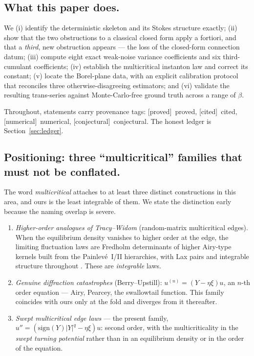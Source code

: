 \documentclass[11pt,reqno]{amsart}
\theoremstyle{plain}
\theoremstyle{definition}
\theoremstyle{remark}
\newcommand{\tagP}{{\footnotesize\textsf{[proved]}}}
\newcommand{\tagC}{{\footnotesize\textsf{[cited]}}}
\newcommand{\tagN}{{\footnotesize\textsf{[numerical]}}}
\newcommand{\tagX}{{\footnotesize\textsf{[conjectural]}}}
\begin{document}
\subsection{What this paper does.}
We (i) identify the deterministic skeleton and its Stokes structure exactly; (ii) show that the two
obstructions to a classical closed form apply a fortiori, and that a \emph{third}, new obstruction
appears --- the loss of the closed-form connection datum; (iii) compute eight exact weak-noise
variance coefficients and six third-cumulant coefficients; (iv) establish the multicritical
instanton law and correct its constant; (v) locate the Borel-plane data, with an explicit
calibration protocol that reconciles three otherwise-disagreeing estimators; and (vi) validate the
resulting trans-series against Monte-Carlo-free ground truth across a range of $\beta$.

Throughout, statements carry provenance tags: \tagP\ proved, \tagC\ cited, \tagN\ numerical,
\tagX\ conjectural. The honest ledger is Section~\ref{sec:ledger}.

\subsection{Positioning: three ``multicritical'' families that must not be conflated.}
The word \emph{multicritical} attaches to at least three distinct constructions in this area, and
ours is the least integrable of them. We state the distinction early because the naming overlap is
severe.

\begin{enumerate}
\item[(i)] \emph{Higher-order analogues of Tracy--Widom} (random-matrix multicritical edges). When
the equilibrium density vanishes to higher order at the edge, the limiting fluctuation laws are
Fredholm determinants of higher Airy-type kernels built from the Painlev\'e~I/II hierarchies, with
Lax pairs and integrable structure throughout \cite{ClaeysKuijlaarsVanlessen,BertolaCafasso,
CafassoClaeys,MulticriticalSchur}. These are \emph{integrable} laws.
\item[(ii)] \emph{Genuine diffraction catastrophes} (Berry--Upstill): $u^{(n)}=(Y-\eta\xi)u$, an
$n$-th order equation --- Airy, Pearcey, the swallowtail function. This family coincides with ours
only at the fold and diverges from it thereafter.
\item[(iii)] \emph{Swept multicritical edge laws} --- the present family, $u''=(\mathrm{sign}(Y)|Y|^q
-\eta\xi)u$: second order, with the multicriticality in the \emph{swept turning potential} rather
than in an equilibrium density or in the order of the equation.
\end{enumerate}
\end{document}
